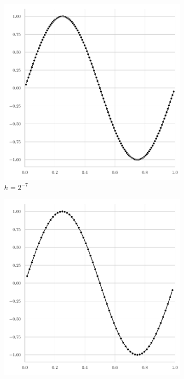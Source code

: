 \begin{figure}
\begin{subfigure}[b]{0.32\textwidth}
	\end{subfigure}
		\begin{subfigure}[b]{0.32\textwidth}
		\centering
		\includegraphics[width=\textwidth]{figures/error_plots//initial_error_2pi_level7.pdf}
		\caption{$h = 2^{-7}$}
	\end{subfigure}
	\hfill
	\begin{subfigure}[b]{0.32\textwidth}
		\centering
		\includegraphics[width=\textwidth]{figures/error_plots//initial_error_2pi_level6.pdf}

\end{subfigure}
\end{figure}
